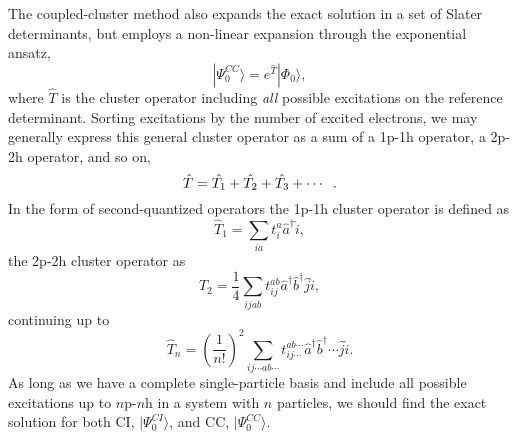 \documentclass[aps,twocolumn,showpacs,floatfix,nofootinbib,preprintnumbers,superscriptaddress,amsmath,amssymb]{revtex4-1}
\begin{document}
The coupled-cluster method also expands the exact solution in a set of Slater determinants, but employs a non-linear expansion through the exponential ansatz,
\begin{equation}
\label{eq:CC:expon}
|\Psi_0^{CC} \rangle = e^{\hat{T}} |\Phi_0 \rangle ,
\end{equation}
where $\hat{T}$ is the cluster operator including \textit{all} possible excitations on the reference determinant.
Sorting excitations by the number of excited electrons, we may generally express this general cluster operator as a sum of a 1p-1h operator, a 2p-2h operator, and so on,
\begin{equation}
\hat{T} = \hat{T_1} + \hat{T_2} + \hat{T_3} + \cdots \hspace{2mm}.
\end{equation}
In the form of second-quantized operators the 1p-1h cluster operator is defined as
\begin{equation}
\hat{T}_1 = \sum_{ia} t_i^a \hat{a}^{\dagger} \hat{i},
\end{equation}
the 2p-2h cluster operator as
\begin{equation}
\hat{T}_2 = \frac{1}{4} \sum_{ijab} t_{ij}^{ab} \hat{a}^{\dagger} \hat{b}^{\dagger} \hat{j} \hat{i},
\end{equation}
continuing up to 
\begin{equation}
\hat{T}_n = \left( \frac{1}{n!}\right)^2 \sum_{ij\cdots ab\cdots} t_{ij\cdots}^{ab\cdots} \hat{a}^{\dagger} \hat{b}^{\dagger} \cdots \hat{j} \hat{i} .
\end{equation}
As long as we have a complete single-particle basis and include all possible excitations up to $n$p-$n$h in a system with $n$ particles, we should find the exact solution for both CI, $|\Psi_0^{CI}\rangle$, and CC, $|\Psi_0^{CC}\rangle$.
\end{document}
